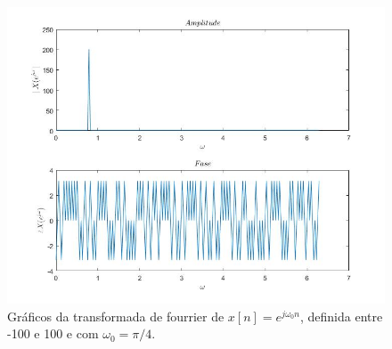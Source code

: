 \documentclass[a4paper, 12pt]{article}
\begin{document}
\begin{figure}[H]
	\centering
	\includegraphics[scale=0.7]{img1.jpg} 
	\caption{Gráficos da transformada de fourrier de  $x[n]=e^{j\omega_0 n}$, definida entre -100 e 100 e com $\omega_0=\pi/4$.}
	\label{fig:1a}
\end{figure}
\end{document}
